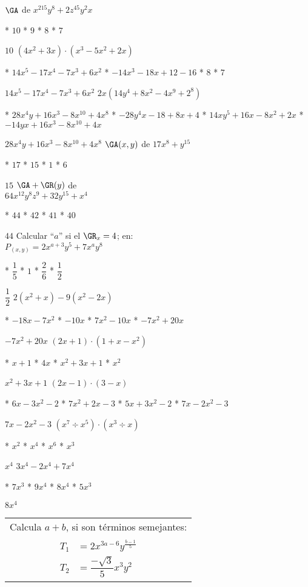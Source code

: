 $\GA$ de $x^215y^8+2z^45y^2x$
\begin{enum}
	* $10$
	* $9$
	* $8$
	* $7$
\end{enum}
$10$
$\left(4x^2+3x\right)\cdot\left(x^3-5x^2+2x\right)$
\begin{enum}
	* $14x^5-17x^4-7x^3+6x^2$
	* $-14x^3-18x+12-16$
	* $8$
	* $7$
\end{enum}
$14x^5-17x^4-7x^3+6x^2$
$2x\left(14y^4+8x^2-4x^9+2^8\right)$
\begin{enum}
	* $28x^4y+16x^3-8x^{10}+4x^8$
	* $-28y^4x-18+8x+4$
	* $14xy^5+16x-8x^2+2x$
	* $-14yx+16x^3-8x^{10}+4x$
\end{enum}
$28x^4y+16x^3-8x^{10}+4x^8$
$\GA(x,y)$ de $17x^8+y^{15}$
\begin{enum}
	* $17$
	* $15$
	* $1$
	* $6$
\end{enum}
$15$
$\GA+\GR(y)$ de \\
$64x^{12}y^8z^9+32y^{15}+x^4$
\begin{enum}
	* $44$
	* $42$
	* $41$
	* $40$
\end{enum}
$44$
Calcular ``$a$'' si el $\GR_x=4$; en: \\
$P_{(x,y)}=2x^{a+3}y^5+7x^ay^8$
\begin{enum}
	* $\dfrac{1}{5}$
	* $1$
	* $\dfrac{2}{6}$
	* $\dfrac{1}{2}$
\end{enum}
$\dfrac{1}{2}$
$2\left(x^2+x\right)-9\left(x^2-2x\right)$
\begin{enum}
	* $-18x-7x^2$
	* $-10x$
	* $7x^2-10x$
	* $-7x^2+20x$
\end{enum}
$-7x^2+20x$
$(2x+1)\cdot\left(1+x-x^2\right)$
\begin{enum}
	* $x+1$
	* $4x$
	* $x^2+3x+1$
	* $x^2$
\end{enum}
$x^2+3x+1$
$(2x-1)\cdot(3-x)$
\begin{enum}
	* $6x-3x^2-2$
	* $7x^2+2x-3$
	* $5x+3x^2-2$
	* $7x-2x^2-3$
\end{enum}
$7x-2x^2-3$
$\left(x^7\div x^5\right)\cdot\left(x^3\div x\right)$
\begin{enum}
	* $x^2$
	* $x^4$
	* $x^6$
	* $x^3$
\end{enum}
$x^4$
$3x^4-2x^4+7x^4$
\begin{enum}
	* $7x^3$
	* $9x^4$
	* $8x^4$
	* $5x^3$
\end{enum}
$8x^4$
\begin{tabular}{c}
	Calcula $a+b$, si son t\'erminos semejantes: \\
	$\begin{aligned}
		T_1&=2x^{3a-6}y^{\frac{b-1}{5}} \\
		T_2&=\dfrac{-\sqrt{3}}{5}x^3y^2
	\end{aligned}$
\end{tabular}
